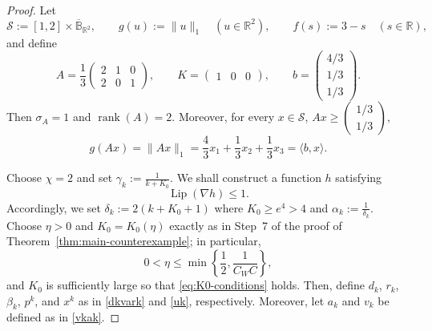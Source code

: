 \documentclass[11pt]{article}
\numberwithin{equation}{section}
\newcommand{\R}{\mathbb{R}}
\begin{document}
%

\begin{proof}
Let
\[
\mathcal S:=[1,2]\times \overline{\mathbb B}_{\R^2},
\qquad
g(u):=\|u\|_1 \quad (u\in\mathbb R^2),
\qquad
f(s):=3-s \quad (s\in\mathbb R),
\]
and define
\[
A=\frac13
\begin{pmatrix}
2&1&0\\
2&0&1
\end{pmatrix},
\qquad
K=
\begin{pmatrix}
1&0&0
\end{pmatrix},
\qquad
b=
\begin{pmatrix}
4/3\\
1/3\\
1/3
\end{pmatrix}.
\]
Then
$\sigma_A=1$ and $\operatorname{rank}(A)=2.$
Moreover, for every \(x\in\mathcal S\),
$
Ax\geq
\begin{pmatrix}
1/3\\
1/3
\end{pmatrix},$
$$g(Ax)=\|Ax\|_1=\frac{4}{3}x_1+\frac{1}{3}x_2+\frac{1}{3}x_3=\langle b,x\rangle.$$

\noindent Choose \(\chi=2\) and set
$
\gamma_k:=\frac{1}{k+K_0}.
$
We shall construct a function \(h\) satisfying
\[
\operatorname{Lip}(\nabla h)\leq 1.
\]
Accordingly, we set
$
\delta_k:=2(k+K_0+1)$ where $K_0\ge e^4>4$
and
$\alpha_k:=\frac{1}{\delta_k}.$
Choose $\eta>0$ and $K_0=K_0(\eta)$ exactly as in Step~7 of the
proof of Theorem~\ref{thm:main-counterexample}; in particular,
\[
    0<\eta\leq
    \min\left\{\frac12,\frac{1}{C_WC}\right\},
\]
and $K_0$ is sufficiently large so that \eqref{eq:K0-conditions}
holds.
Then, define \(d_k\), \(r_k\), \(\beta_k\), \(p^k\),
and \(x^k\) as in \eqref{dkvark} and \eqref{uk}, respectively.
Moreover, let \(a_k\) and \(v_k\) be defined as in \eqref{vkak}.


\end{proof}
\end{document}
